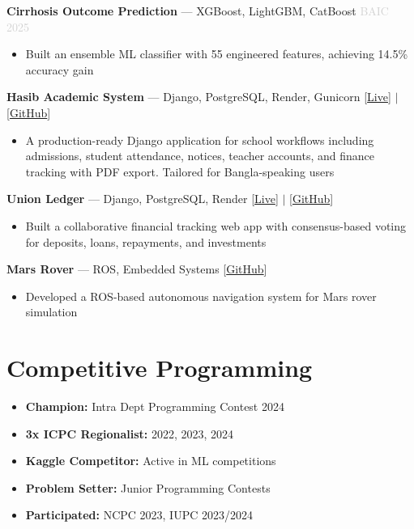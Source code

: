 \documentclass[letterpaper,11pt]{extarticle}
\begin{document}
\vspace{0.2cm}
\textbf{Cirrhosis Outcome Prediction} --- XGBoost, LightGBM, CatBoost \hfill \textcolor{lightgray}{BAIC 2025}
\begin{itemize}[noitemsep, topsep=0pt]
    \item Built an ensemble ML classifier with 55 engineered features, achieving 14.5\% accuracy gain
\end{itemize}

\vspace{0.2cm}
\textbf{Hasib Academic System} --- Django, PostgreSQL, Render, Gunicorn \hfill [\href{https://hasibislamicacademy.github.io/}{Live}] $|$ [\href{https://github.com/samim-reza/Hasib_School}{GitHub}]
\begin{itemize}[noitemsep, topsep=0pt]
    \item A production-ready Django application for school workflows including admissions, student attendance, notices, teacher accounts, and finance tracking with PDF export. Tailored for Bangla-speaking users
\end{itemize}

\vspace{0.2cm}
\textbf{Union Ledger} --- Django, PostgreSQL, Render \hfill [\href{https://samim-reza.github.io/union}{Live}] $|$ [\href{https://github.com/samim-reza/union}{GitHub}]
\begin{itemize}[noitemsep, topsep=0pt]
    \item Built a collaborative financial tracking web app with consensus-based voting for deposits, loans, repayments, and investments
\end{itemize}

\vspace{0.2cm}
\textbf{Mars Rover} --- ROS, Embedded Systems \hfill [\href{https://github.com/samim-reza/Rover-robot}{GitHub}]
\begin{itemize}[noitemsep, topsep=0pt]
    \item Developed a ROS-based autonomous navigation system for Mars rover simulation
\end{itemize}

\section{Competitive Programming}
\begin{itemize}[noitemsep, topsep=0pt]
    \item \textbf{Champion:} Intra Dept Programming Contest 2024
    \vspace{0.2cm}
    \item \textbf{3x ICPC Regionalist:} 2022, 2023, 2024
    \vspace{0.2cm}
    \item \textbf{Kaggle Competitor:} Active in ML competitions
    \vspace{0.2cm}
    \item \textbf{Problem Setter:} Junior Programming Contests
    \vspace{0.2cm}
    \item \textbf{Participated:} NCPC 2023, IUPC 2023/2024
\end{itemize}
\end{document}
